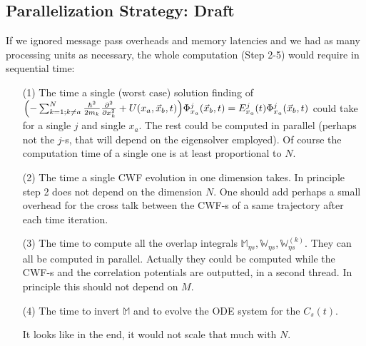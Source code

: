 \documentclass[11pt, a4paper]{article} %
\begin{document}
\subsection{Parallelization Strategy: Draft}
If we ignored message pass overheads and memory latencies and we had as many processing units as necessary, the whole computation (Step 2-5) would require in sequential time:
\begin{enumerate}
\item[(1)] The time a single (worst case) solution finding of $\qty(- \sum_{k=1; k\neq a}^{N} \frac{\hbar^2}{2m_k}\pdv[2]{}{x_k}+U(x_a,\vec{x}_b,t) )\Phi_{x_a}^j(\vec{x}_b,t) = E_{x_a}^j(t)\Phi_{x_a}^j(\vec{x}_b,t)$ could take for a single $j$ and single $x_a$. The rest could be computed in parallel (perhaps not the $j$-s, that will depend on the eigensolver employed). Of course the computation time of a single one is at least proportional to $N$.

\item[(2)] The time a single CWF evolution in one dimension takes. In principle step 2 does not depend on the dimension $N$. One should add perhaps a small overhead for the cross talk between the CWF-s of a same trajectory after each time iteration.
\item[(3)] The time to compute all the overlap integrals $\mathbb{M}_{\eta s}, \mathbb{W}_{\eta s}, \mathbb{W}^{(k)}_{\eta s}$. They can all be computed in parallel. Actually they could be computed while the CWF-s and the correlation potentials are outputted, in a second thread. In principle this should not depend on $M$.

\item[(4)] The time to invert $\mathbb{M}$ and to evolve the ODE system for the $C_s(t)$.

\vspace{+0.3cm}
It looks like in the end, it would not scale that much with $N$.



\end{enumerate}
\end{document}
